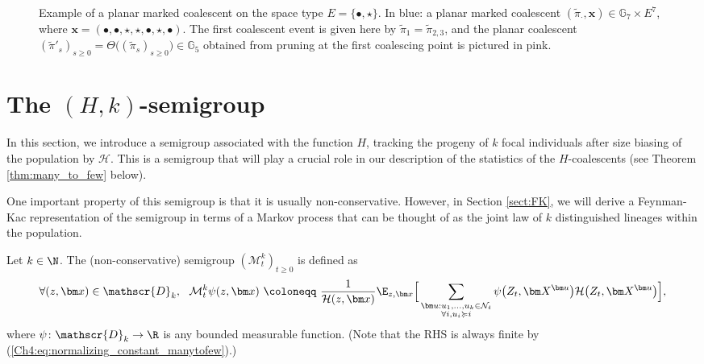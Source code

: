 \begin{refsegment}
\begin{figure}[h!]
{\begin{tikzpicture}[x=0.75pt,y=0.75pt,yscale=-1,xscale=1]
\end{tikzpicture}
   }
    \caption{Example of a planar marked coalescent on the space type $E=\{\bullet,\star\}$. In blue: a planar marked coalescent $(\tilde\pi_\cdot, \bm x)\in \mathbb{G}_{7}\times E^7$, where $\bm x=(\bullet,\bullet,\star,\star,\bullet,\star, \bullet)$. The first coalescent event is given here by $\tilde{\pi}_1=\tilde\pi_{2,3}$, and the planar coalescent $(\tilde \pi '_s)_{s\geq 0} =\Theta\big((\tilde \pi_s)_{s\geq 0}\big)\in \mathbb{G}_{5}$ obtained from pruning at the first coalescing point is pictured in pink.}\label{fig:alternative_chrono_marked}
\end{figure}




\section{The $(H,k)$-semigroup} \label{Ch4:sec:semigroup}
In this section, we introduce a semigroup associated with the function $H$, tracking the progeny of $k$ focal individuals after size biasing of the population by $\mathcal{H}$. 
This is a semigroup that will play 
a crucial role in our description of the statistics of the $H$-coalescents (see Theorem \ref{thm:many_to_few} below).

One important property of this semigroup is that it is usually non-conservative. However, in Section \ref{sect:FK}, we will derive a Feynman-Kac representation of the semigroup in terms of a Markov process that can be thought of as the joint law of $k$ distinguished lineages within the population. 





\begin{defn}[$(H,k)$-semigroup]\label{def:def_P_semigroup} Let
 $k\in\N$. The (non-conservative) semigroup $(\mathcal{M}^k_t)_{t\geq 0}$ is defined as \begin{equation}\label{Ch4:eq:def_P_semigroup}
\forall (z,{\bm x})\in\mathscr{D}_{k}, \ \ \mathcal{M}^k_t\psi( z, \bm x)\ \coloneqq\ \frac{1}{\mathcal H(z,\bm x)}\E_{z,\bm x}\Big[\sum_{ \substack{\bm u: u_1, \ldots, u_k \in \mathcal{N}_t\\ \forall i, u_i\succcurlyeq i}}\psi\big(Z_t, \bm  X^{\bm u}\big)\mathcal{H}\big(Z_t,\bm X^{\bm u}\big) \Big],
\end{equation}
where $\psi \colon \mathscr{D}_k \to \R$ 
is any bounded measurable function. (Note that  the RHS is always finite by (\ref{Ch4:eq:normalizing_constant_manytofew}).) 
\end{defn}



\end{refsegment}
